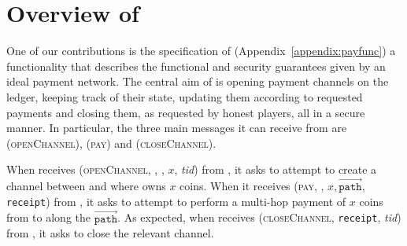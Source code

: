 \section{Overview of \fpaynet{}}
  One of our contributions is the specification of \fpaynet
  (Appendix~\ref{appendix:payfunc}) a functionality that describes the
  functional and security guarantees given by an ideal payment network. The
  central aim of \fpaynet{} is opening payment channels on the ledger, keeping
  track of their state, updating them according to requested payments and
  closing them, as requested by honest players, all in a secure manner. In
  particular, the three main messages it can receive from \alice{} are
  (\textsc{openChannel}), (\textsc{pay}) and (\textsc{closeChannel}).

  When \fpaynet{} receives (\textsc{openChannel}, \alice, \bob, $x$,
  \textit{tid}) from \alice, it asks \simulator{} to attempt to create a channel
  between \alice{} and \bob{} where \alice{} owns $x$ coins. When it receives
  (\textsc{pay}, \bob, $x, \overrightarrow{\mathtt{path}}$, \texttt{receipt})
  from \alice, it asks \simulator{} to attempt to perform a multi-hop payment of
  $x$ coins from \alice{} to \bob{} along the $\overrightarrow{\mathtt{path}}$.
  As expected, when \fpaynet{} receives (\textsc{closeChannel}, \texttt{receipt},
  \textit{tid}) from \alice, it asks \simulator{} to close the relevant channel.

